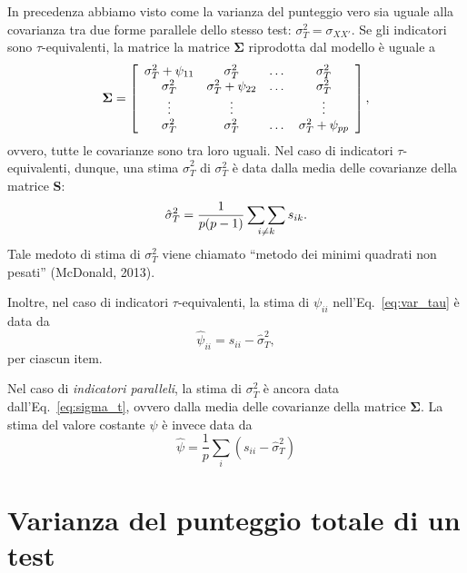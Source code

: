 In precedenza abbiamo visto come 
la varianza del punteggio vero sia uguale alla covarianza tra due forme
parallele dello stesso test:
$
\sigma^2_T = \sigma_{XX'}
$. Se gli indicatori sono $\tau$-equivalenti, la matrice la matrice $\boldsymbol{\Sigma}$
  riprodotta dal modello è uguale a
  \begin{equation}
    \boldsymbol{\Sigma}=\left[
      \begin{array}{ c c c c }
        \sigma_{T}^2 + \psi_{11} & \sigma_{T}^2 & \dots & \sigma_{T}^2 \\
        \sigma_{T}^2 & \sigma_{T}^2 + \psi_{22} & \dots & \sigma_{T}^2 \\
        \vdots & \vdots & & \vdots\\
        \sigma_{T}^2 & \sigma_{T}^2 & \dots & \sigma_{T}^2 + \psi_{pp} \notag
      \end{array} 
    \right],
  \end{equation}
ovvero, tutte le covarianze sono tra loro uguali. Nel caso di indicatori
  $\tau$-equivalenti, dunque, una stima $\hat{\sigma}^2_T$ di $\sigma^2_T$
 è data dalla media delle covarianze della matrice \textbf{S}:
\begin{equation}
\hat{\sigma}_T^2 = \frac{1}{p(p-1)} \sideset{}{} {\sum \sum}_{i \neq k} s_{ik}.
\label{eq:sigma_t}
\end{equation}
Tale medoto di stima di $\sigma^2_T$ viene chiamato  ``metodo dei minimi quadrati non pesati'' (McDonald, 2013).

Inoltre, nel caso di indicatori $\tau$-equivalenti, la stima di
  $\psi_{ii}$ nell'Eq.~\ref{eq:var_tau}
 è data da
\begin{equation}
\hat{\psi}_{ii }= s_{ii} - \hat{\sigma}_T^2,
\end{equation}
per ciascun item.

Nel caso di \textit{indicatori paralleli}, la stima di
  $\sigma^2_T$ è ancora data dall'Eq.~\ref{eq:sigma_t}, ovvero dalla media delle
  covarianze della matrice $\boldsymbol{\Sigma}$.
 La stima del valore costante $\psi$ è invece data da
\begin{equation}
\hat{\psi} = \frac{1}{p} \sum_i (s_{ii} - \hat{\sigma}_T^2)
\label{eq:psi_par_st}
\end{equation}


\section{Varianza del punteggio totale di un test}

